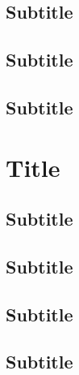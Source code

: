 \documentclass[12pt,a4paper]{article}
\begin{document}
\subsection{Subtitle}
\lipsum[1]
\subsection{Subtitle}
\lipsum[1]
\subsection{Subtitle}
\lipsum[1]
\newpage
\section{Title}
\subsection{Subtitle}
\lipsum[1]
\subsection{Subtitle}
\lipsum[1]
\subsection{Subtitle}
\lipsum[1]
\subsection{Subtitle}
\lipsum[1]

\printbibliography[nottype=book,heading=bibliography,title={References}]
\end{document}
